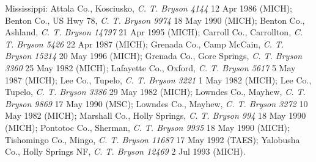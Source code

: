 \documentclass{article}
\begin{document}
Mississippi:
Attala Co., Kosciusko, \textit{C. T. Bryson 4144} 12 Apr 1986 (MICH);
Benton Co., US Hwy 78, \textit{C. T. Bryson 9974} 18 May 1990 (MICH);
Benton Co., Ashland, \textit{C. T. Bryson 14797} 21 Apr 1995 (MICH);
Carroll Co., Carrollton, \textit{C. T. Bryson 5426} 22 Apr 1987 (MICH);
Grenada Co., Camp McCain, \textit{C. T. Bryson 15214} 20 May 1996 (MICH);
Grenada Co., Gore Springs, \textit{C. T. Bryson 3360} 25 May 1982 (MICH);
Lafayette Co., Oxford, \textit{C. T. Bryson 5617} 5 May 1987 (MICH);
Lee Co., Tupelo, \textit{C. T. Bryson 3221} 1 May 1982 (MICH);
Lee Co., Tupelo, \textit{C. T. Bryson 3386} 29 May 1982 (MICH);
Lowndes Co., Mayhew, \textit{C. T. Bryson 9869} 17 May 1990 (MSC);
Lowndes Co., Mayhew, \textit{C. T. Bryson 3272} 10 May 1982 (MICH);
Marshall Co., Holly Springs, \textit{C. T. Bryson 994} 18 May 1990 (MICH);
Pontotoc Co., Sherman, \textit{C. T. Bryson 9935} 18 May 1990 (MICH);
Tishomingo Co., Mingo, \textit{C. T. Bryson 11687} 17 May 1992 (TAES);
Yalobusha Co., Holly Springs NF, \textit{C. T. Bryson 12469} 2 Jul 1993 (MICH).
\end{document}
